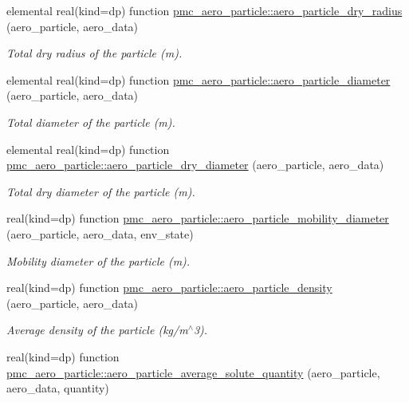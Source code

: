 \begin{DoxyCompactItemize}
elemental real(kind=dp) function \mbox{\hyperlink{namespacepmc__aero__particle_acb06f29420c625923fbc8f7a8fd491d0}{pmc\+\_\+aero\+\_\+particle\+::aero\+\_\+particle\+\_\+dry\+\_\+radius}} (aero\+\_\+particle, aero\+\_\+data)
\begin{DoxyCompactList}\small\item\em Total dry radius of the particle (m). \end{DoxyCompactList}\item 
elemental real(kind=dp) function \mbox{\hyperlink{namespacepmc__aero__particle_af994784058490064bddb39303202b919}{pmc\+\_\+aero\+\_\+particle\+::aero\+\_\+particle\+\_\+diameter}} (aero\+\_\+particle, aero\+\_\+data)
\begin{DoxyCompactList}\small\item\em Total diameter of the particle (m). \end{DoxyCompactList}\item 
elemental real(kind=dp) function \mbox{\hyperlink{namespacepmc__aero__particle_a3fd3219998b2c59283ad7c51bf59fd4b}{pmc\+\_\+aero\+\_\+particle\+::aero\+\_\+particle\+\_\+dry\+\_\+diameter}} (aero\+\_\+particle, aero\+\_\+data)
\begin{DoxyCompactList}\small\item\em Total dry diameter of the particle (m). \end{DoxyCompactList}\item 
real(kind=dp) function \mbox{\hyperlink{namespacepmc__aero__particle_a238e9238bf464acfce55838436c0d668}{pmc\+\_\+aero\+\_\+particle\+::aero\+\_\+particle\+\_\+mobility\+\_\+diameter}} (aero\+\_\+particle, aero\+\_\+data, env\+\_\+state)
\begin{DoxyCompactList}\small\item\em Mobility diameter of the particle (m). \end{DoxyCompactList}\item 
real(kind=dp) function \mbox{\hyperlink{namespacepmc__aero__particle_a7390039f97b4cefc54456bd951138b36}{pmc\+\_\+aero\+\_\+particle\+::aero\+\_\+particle\+\_\+density}} (aero\+\_\+particle, aero\+\_\+data)
\begin{DoxyCompactList}\small\item\em Average density of the particle (kg/m$^\wedge$3). \end{DoxyCompactList}\item 
real(kind=dp) function \mbox{\hyperlink{namespacepmc__aero__particle_a461f8f91322c817e32292d9fa5f618f2}{pmc\+\_\+aero\+\_\+particle\+::aero\+\_\+particle\+\_\+average\+\_\+solute\+\_\+quantity}} (aero\+\_\+particle, aero\+\_\+data, quantity)

\end{DoxyCompactItemize}
